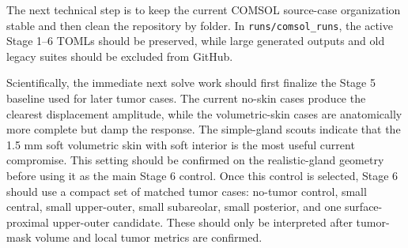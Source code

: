 The next technical step is to keep the current COMSOL source-case organization stable and then clean the repository by folder. In \texttt{runs/comsol\_runs}, the active Stage 1--6 TOMLs should be preserved, while large generated outputs and old legacy suites should be excluded from GitHub.

Scientifically, the immediate next solve work should first finalize the Stage 5 baseline used for later tumor cases. The current no-skin cases produce the clearest displacement amplitude, while the volumetric-skin cases are anatomically more complete but damp the response. The simple-gland scouts indicate that the 1.5 mm soft volumetric skin with soft interior is the most useful current compromise. This setting should be confirmed on the realistic-gland geometry before using it as the main Stage 6 control. Once this control is selected, Stage 6 should use a compact set of matched tumor cases: no-tumor control, small central, small upper-outer, small subareolar, small posterior, and one surface-proximal upper-outer candidate. These should only be interpreted after tumor-mask volume and local tumor metrics are confirmed.
